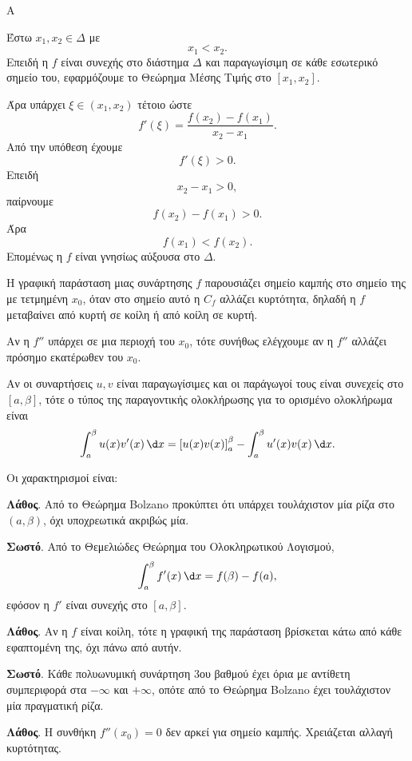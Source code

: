 \begin{thema}{Α}
\begin{erwthma}
\item Έστω $x_1,x_2\in\varDelta$ με
\[
x_1<x_2.
\]
Επειδή η $f$ είναι συνεχής στο διάστημα $\varDelta$ και παραγωγίσιμη σε κάθε εσωτερικό σημείο του, εφαρμόζουμε το Θεώρημα Μέσης Τιμής στο $[x_1,x_2]$.

Άρα υπάρχει $\xi\in(x_1,x_2)$ τέτοιο ώστε
\[
f'(\xi)=\frac{f(x_2)-f(x_1)}{x_2-x_1}.
\]
Από την υπόθεση έχουμε
\[
f'(\xi)>0.
\]
Επειδή
\[
x_2-x_1>0,
\]
παίρνουμε
\[
f(x_2)-f(x_1)>0.
\]
Άρα
\[
f(x_1)<f(x_2).
\]
Επομένως η $f$ είναι γνησίως αύξουσα στο $\varDelta$.

\item Η γραφική παράσταση μιας συνάρτησης $f$ παρουσιάζει σημείο καμπής στο σημείο της με τετμημένη $x_0$, όταν στο σημείο αυτό η $C_f$ αλλάζει κυρτότητα, δηλαδή η $f$ μεταβαίνει από κυρτή σε κοίλη ή από κοίλη σε κυρτή.

Αν η $f''$ υπάρχει σε μια περιοχή του $x_0$, τότε συνήθως ελέγχουμε αν η $f''$ αλλάζει πρόσημο εκατέρωθεν του $x_0$.

\item Αν οι συναρτήσεις $u,v$ είναι παραγωγίσιμες και οι παράγωγοί τους είναι συνεχείς στο $[a,\beta]$, τότε ο τύπος της παραγοντικής ολοκλήρωσης για το ορισμένο ολοκλήρωμα είναι
\[
\dint_a^\beta u(x)v'(x)\,\d x
=
\left[u(x)v(x)\right]_a^\beta
-
\dint_a^\beta u'(x)v(x)\,\d x.
\]

\item Οι χαρακτηρισμοί είναι:
\begin{alist}
\item \textbf{Λάθος}. Από το Θεώρημα Bolzano προκύπτει ότι υπάρχει τουλάχιστον μία ρίζα στο $(a,\beta)$, όχι υποχρεωτικά ακριβώς μία.
\item \textbf{Σωστό}. Από το Θεμελιώδες Θεώρημα του Ολοκληρωτικού Λογισμού,
\[
\dint_a^\beta f'(x)\,\d x=f(\beta)-f(a),
\]
εφόσον η $f'$ είναι συνεχής στο $[a,\beta]$.
\item \textbf{Λάθος}. Αν η $f$ είναι κοίλη, τότε η γραφική της παράσταση βρίσκεται κάτω από κάθε εφαπτομένη της, όχι πάνω από αυτήν.
\item \textbf{Σωστό}. Κάθε πολυωνυμική συνάρτηση 3ου βαθμού έχει όρια με αντίθετη συμπεριφορά στα $-\infty$ και $+\infty$, οπότε από το Θεώρημα Bolzano έχει τουλάχιστον μία πραγματική ρίζα.
\item \textbf{Λάθος}. Η συνθήκη $f''(x_0)=0$ δεν αρκεί για σημείο καμπής. Χρειάζεται αλλαγή κυρτότητας.
\end{alist}
\end{erwthma}
\end{thema}

